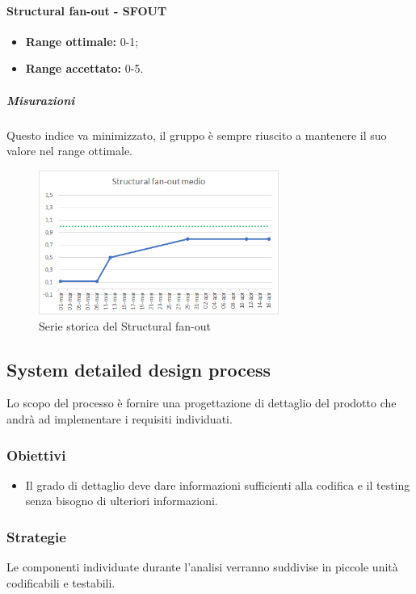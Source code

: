 			\paragraph{Structural fan-out - SFOUT} \Spazio
			\begin{itemize}
				\item \textbf{Range ottimale:} 0-1;
				\item \textbf{Range accettato:} 0-5.
			\end{itemize}
		    \subparagraph{Misurazioni}
		     Questo indice va minimizzato, il gruppo è sempre riuscito a mantenere il suo valore nel range ottimale.
		    \begin{figure}[H]
		    	\centering 
		    	\includegraphics[width=0.7\textwidth]{Images/SFOUT.png}
		    	\caption{Serie storica del Structural fan-out}
		    	\label{SFOUT} 
		    \end{figure}
	       
            

\subsection{System detailed design process}
Lo scopo del processo è fornire una progettazione di dettaglio del prodotto che andrà ad implementare i requisiti individuati.
		\subsubsection{Obiettivi}
		\begin{itemize}
			\item Il grado di dettaglio deve dare informazioni sufficienti alla codifica e il testing senza bisogno di ulteriori informazioni.
		\end{itemize}
		\subsubsection{Strategie}
		Le componenti individuate durante l'analisi verranno suddivise in piccole unità codificabili e testabili.
